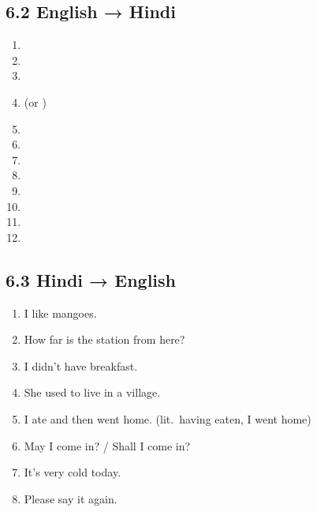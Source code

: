 \subsection{6.2 English → Hindi}
\begin{enumerate}
  \item {}
  \item {}
  \item {}
  \item {} (or )
  \item {}
  \item {}
  \item {}
  \item {}
  \item {}
  \item {}
  \item {}
  \item {}
\end{enumerate}

\subsection{6.3 Hindi → English}
\begin{enumerate}
  \item I like mangoes.
  \item How far is the station from here?
  \item I didn't have breakfast.
  \item She used to live in a village.
  \item I ate and then went home. (lit.\ having eaten, I went home)
  \item May I come in? / Shall I come in?
  \item It's very cold today.
  \item Please say it again.
\end{enumerate}
